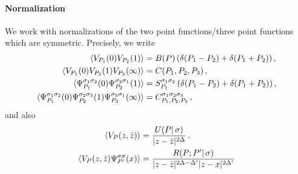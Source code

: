 \documentclass[a4paper]{article}
\begin{document}
\paragraph{Normalization} We work with normalizations of the two point functions/three point functions which are symmetric. Precisely, we write
\begin{equation}\label{eq:Normalizations}
\begin{aligned}
  \braket{V_{P_1}(0)V_{P_2}(1)}&=B(P)\, (\delta(P_1-P_2)+\delta(P_1+P_2))\,,\\
  \braket{V_{P_1}(0)V_{P_2}(1)V_{P_3}(\infty)}&= C(P_1,P_2,P_3)\,,\\
  \braket{\Psi_{P_1}^{\sigma_1 \sigma_2}(0)\Psi_{P_2}^{\sigma_2 \sigma_1}(1)}&= S_{P_1}^{\sigma_1 \sigma_2}\, (\delta(P_1-P_2)+\delta(P_1+P_2))\,,\\
  \braket{\Psi_{P_1}^{\sigma_1 \sigma_2}(0)\Psi_{P_2}^{\sigma_2 \sigma_3}(1)\Psi_{P_3}^{\sigma_3 \sigma_1}(\infty)} &= C_{P_1,P_2,P_3}^{\sigma_1 \sigma_2 \sigma_3}\,,\\
\end{aligned}
\end{equation}
and also 
\begin{equation}\label{eq:Normalizationsbis}
\begin{aligned}
  \braket{V_{P}(z,\bar{z})}&=\frac{U(P|\,\sigma)}{|z-\bar{z}|^{2\Delta}}\,.\\
  \braket{V_{P}(z,\bar{z})\Psi_{P'}^{\sigma \sigma}(x)}&=\frac{R(P;P'|\,\sigma)}{|z-\bar{z}|^{2\Delta -\Delta'}|z-x|^{2\Delta'}}
\end{aligned}
\end{equation}
\end{document}
